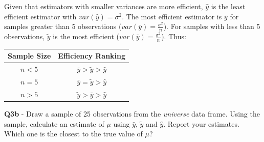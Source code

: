 \documentclass[
]{article}
\begin{document}
\hfill\break
Given that estimators with smaller variances are more efficient,
\(\hat{y}\) is the least efficient estimator with
\(var(\hat{y})= \sigma^2\). The most efficient estimator is \(\bar{y}\)
for samples greater than 5 observations
(\(var(\bar{y})= \frac{\sigma^2}{n}\)). For samples with less than 5
observations, \(\tilde{y}\) is the most efficient
(\(var(\bar{y})= \frac{\sigma^2}{n}\)). Thus:

\begin{longtable}[]{@{}cc@{}}
\toprule\noalign{}
Sample Size & Efficiency Ranking \\
\midrule\noalign{}
\endhead
\bottomrule\noalign{}
\endlastfoot
\(n < 5\) & \(\bar{y} > \tilde{y} > \hat{y}\) \\
\(n = 5\) & \(\bar{y} = \tilde{y} > \hat{y}\) \\
\(n > 5\) & \(\tilde{y} > \bar{y} > \hat{y}\) \\
\end{longtable}

\hfill\break
\hfill\break

\textbf{Q3b} - Draw a sample of 25 observations from the
\textit{universe} data frame. Using the sample, calculate an estimate of
\(\mu\) using \(\bar{y}\), \(\tilde{y}\) and \(\hat{y}\). Report your
estimates. Which one is the closest to the true value of \(\mu\)?\\
\end{document}
